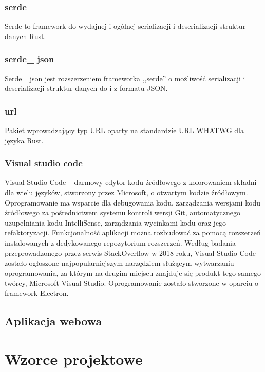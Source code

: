 \documentclass[12pt,a4paper]{article}
\begin{document}
				\subsubsection{serde}

					\indent Serde to framework do wydajnej i ogólnej serializacji i deserializacji struktur danych Rust.
				\subsubsection{serde\_ json}

					\indent Serde\_ json jest rozszerzeniem frameworka ,,serde'' o możliwość serializacji i deserializacji struktur danych do i z formatu JSON.
				\subsubsection{url}

					\indent Pakiet wprowadzający typ URL oparty na standardzie URL WHATWG dla języka Rust.
				\subsubsection{Visual studio code}

					\indent Visual Studio Code – darmowy edytor kodu źródłowego z kolorowaniem składni dla wielu języków, stworzony przez Microsoft,
					o otwartym kodzie źródłowym. Oprogramowanie ma wsparcie dla debugowania kodu, zarządzania wersjami kodu źródłowego za pośrednictwem systemu kontroli wersji Git,
					automatycznego uzupełniania kodu IntelliSense, zarządzania wycinkami kodu oraz jego refaktoryzacji. Funkcjonalność aplikacji można rozbudować za pomocą rozszerzeń
					instalowanych z dedykowanego repozytorium rozszerzeń. Według badania przeprowadzonego przez serwis StackOverflow w 2018 roku, Visual Studio Code zostało
					ogłoszone najpopularniejszym narzędziem służącym wytwarzaniu oprogramowania, za którym na drugim miejscu znajduje się produkt tego samego twórcy,
					Microsoft Visual Studio. Oprogramowanie zostało stworzone w oparciu o framework Electron. 
				
		\subsection{Aplikacja webowa}
	\newpage
	
	\section{Wzorce projektowe}
\end{document}
